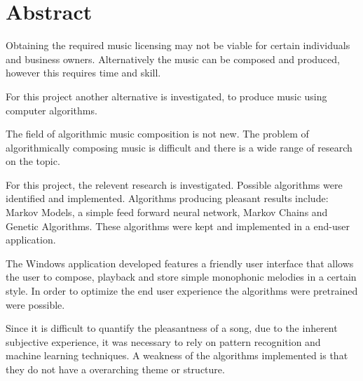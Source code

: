 \begingroup
\let\clearpage\relax
\let\cleardoublepage\relax
\let\cleardoublepage\relax

\chapter*{Abstract}


Obtaining the required music licensing may not be viable for certain individuals and business owners. Alternatively the music can be composed and produced, however this requires time and skill.

For this project another alternative is investigated, to produce music using computer algorithms. 

The field of algorithmic music composition is not new. The problem of algorithmically composing music is difficult and there is a wide range of research on the topic.

For this project, the relevent research is investigated. Possible algorithms were identified and implemented. Algorithms producing pleasant results include: Markov Models, a simple feed forward neural network, Markov Chains and Genetic Algorithms. These algorithms were kept and implemented in a end-user application. 

The Windows application developed features a friendly user interface that allows the user to compose, playback and store simple monophonic melodies in a certain style. In order to optimize the end user experience the algorithms were pretrained were possible.

Since it is difficult to quantify the pleasantness of a song, due to the inherent subjective experience, it was necessary to rely on pattern recognition and machine learning techniques. A weakness of the algorithms implemented is that they do not have a overarching theme or structure. 



\vfill



\endgroup			

\vfill